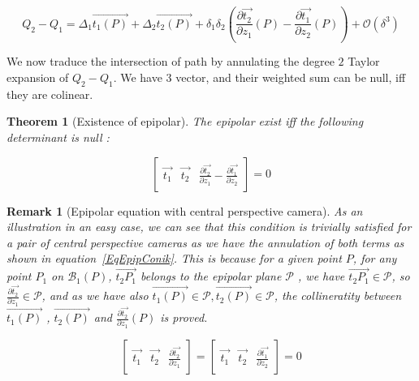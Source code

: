 \documentclass{ipol}
\newcommand{\Bund}[1]{\ensuremath{\mathcal{B}_{#1}}}
\newcommand{\BundO}{\Bund{1}}
\newcommand{\BigV}[1]{\ensuremath{\overrightarrow{#1}}}
\newcommand{\TanO}[1]{\BigV{t_1#1}}
\newcommand{\TanT}[1]{\BigV{t_2#1}}
\newcommand{\Negl}[1]{\ensuremath{\mathcal{O}(#1)}}
\newcommand{\DerPart}[2]{\frac{\partial #1}{\partial #2}}
\newtheorem{theorem}{Theorem}
\newtheorem{remark}{Remark}
\begin{document}
\begin{equation}
    Q_2 -Q_1 =   \Delta_1 \TanO{(P)} +   \Delta_2 \TanT{(P)}  
               + \delta_1  \delta_2(\DerPart { \TanT{}}{z_1}(P)  -\DerPart { \TanO{}}{z_2}(P) )
               + \Negl{\delta^3}
\end{equation}


We now traduce the intersection of path by annulating the degree $2$ Taylor expansion of $Q_2 -Q_1$.
We have  $3$ vector, and their weighted sum can be null, iff they are colinear.

\begin{theorem}[Existence of epipolar]
The epipolar exist iff the following determinant is null :

\begin{equation}
\left[ \begin{array}{c|c|c}
\TanO{} & \TanT{}  & \DerPart { \TanT{}}{z_1}  -\DerPart { \TanO{}}{z_2}  
\end{array} \right]  
=0
\end{equation}

\end{theorem}

\begin{remark}[Epipolar equation with central perspective camera]
As an illustration in an easy case, we can see that this condition is trivially 
satisfied for a pair of central perspective cameras as we have the annulation of both terms as shown
in equation~\ref{EqEpipConik}. This is because for a given point $P$,
for any point $P_1$ on $\BundO(P)$, $\TanT{P_1}$ belongs to the epipolar
plane $\mathcal{P}$ , we have $\TanT{P_1} \in \mathcal{P}$, so $\DerPart { \TanT{}}{z_1} \in \mathcal{P}$,
and as we have also $\TanO{(P)} \in  \mathcal{P}, \TanT{(P)} \in  \mathcal{P}$, the collineratity
between $\TanO{(P)}$ , $\TanT{(P)}$ and $\DerPart { \TanT{}}{z_1}(P)$ is proved.

\begin{equation}
\left[ \begin{array}{c|c|c}
\TanO{} & \TanT{}  & \DerPart { \TanT{}}{z_1}  
\end{array} \right]  
=\left[ \begin{array}{c|c|c}
\TanO{} & \TanT{}  & \DerPart { \TanO{}}{z_2}  
\end{array} \right]  
=0
\label{EqEpipConik}
\end{equation}
\end{remark}


\end{document}
